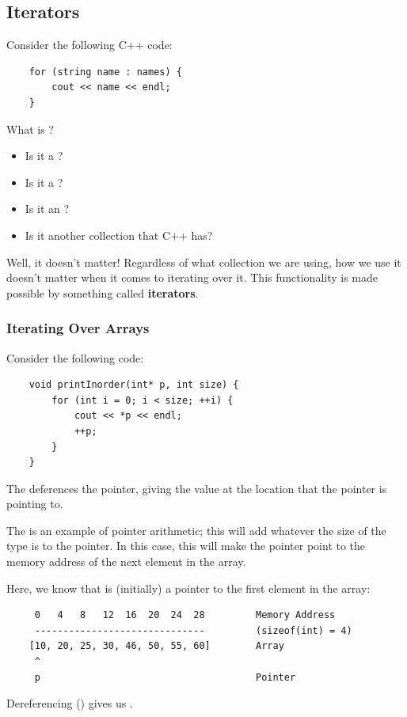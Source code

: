 \documentclass[letterpaper]{article}
\begin{document}
\subsection{Iterators}
Consider the following C++ code: 
\begin{verbatim}
    for (string name : names) {
        cout << name << endl; 
    }
\end{verbatim}
What is ? 
\begin{itemize}
    \item Is it a ? 
    \item Is it a ? 
    \item Is it an ?
    \item Is it another collection that C++ has? 
\end{itemize}
Well, it doesn't matter! Regardless of what collection we are using, how we use it doesn't matter when it comes to iterating over it. This functionality is made possible by something called \textbf{iterators}.

\subsubsection{Iterating Over Arrays}
Consider the following code: 
\begin{verbatim}
    void printInorder(int* p, int size) {
        for (int i = 0; i < size; ++i) {
            cout << *p << endl; 
            ++p; 
        }
    }
\end{verbatim}
The  deferences the pointer, giving the value at the location that the pointer is pointing to. 

\bigskip

The  is an example of pointer arithmetic; this will add whatever the size of the type is to the pointer. In this case, this will make the pointer point to the memory address of the next element in the array. 

\bigskip 

Here, we know that  is (initially) a pointer to the first element in the array: 
\begin{verbatim}
     0   4   8   12  16  20  24  28         Memory Address 
     ------------------------------         (sizeof(int) = 4)
    [10, 20, 25, 30, 46, 50, 55, 60]        Array 
     ^
     p                                      Pointer 
\end{verbatim}
Dereferencing  () gives us . 
\end{document}
